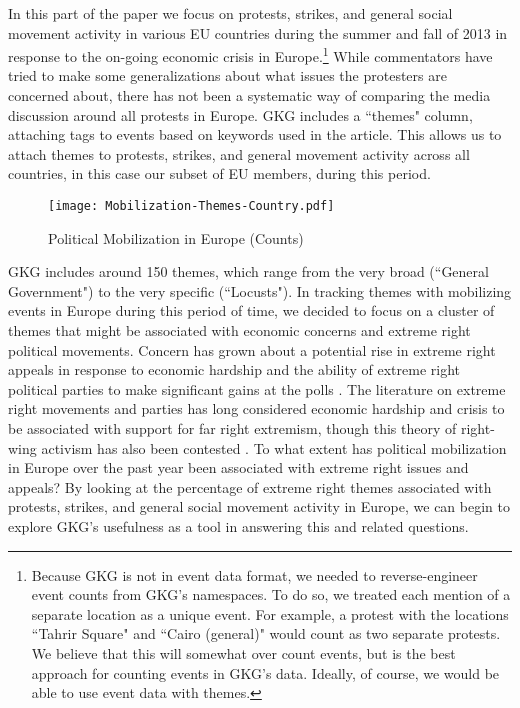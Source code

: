 \documentclass[10pt]{article}
\begin{document}
In this part of the paper we focus on protests, strikes, and general social movement activity in various EU countries during the summer and fall of 2013 in response to the on-going economic crisis in Europe.\footnote{Because GKG is not in event data format, we needed to reverse-engineer event counts from GKG's namespaces. To do so, we treated each mention of a separate location as a unique event. For example, a protest with the locations ``Tahrir Square" and ``Cairo (general)" would count as two separate protests. We believe that this will somewhat over count events, but is the best approach for counting events in GKG's data. Ideally, of course, we would be able to use event data with themes.} While commentators have tried to make some generalizations about what issues the protesters are concerned about, there has not been a systematic way of comparing the media discussion around all protests in Europe. GKG includes a ``themes" column, attaching tags to events based on keywords used in the article.  This allows us to attach themes to protests, strikes, and general movement activity across all countries, in this case our subset of EU members, during this period.

\begin{figure*}
\begin{center}
\texttt{[image: Mobilization-Themes-Country.pdf]}
\caption{Political Mobilization in Europe (Counts)}
\end{center}
\end{figure*}

GKG includes around 150 themes, which range from the very broad (``General Government") to the very specific (``Locusts").  In tracking themes with mobilizing events in Europe during this period of time, we decided to focus on a cluster of themes that might be associated with economic concerns and  extreme right political movements.  Concern has grown about a potential rise in extreme right appeals in response to economic hardship and the ability of extreme right political parties to make significant gains at the polls \citep{econ2013monster,bartlett2012populism}.  The literature on extreme right movements and parties has long considered economic hardship and crisis to be associated with support for far right extremism, though this theory of right-wing activism has also been contested \citep{mudde2013decades}.  To what extent has political mobilization in Europe over the past year been associated with extreme right issues and appeals?  By looking at the percentage of extreme right themes associated with protests, strikes, and general social movement activity in Europe, we can begin to explore GKG's usefulness as a tool in answering this and related questions.  
\end{document}

